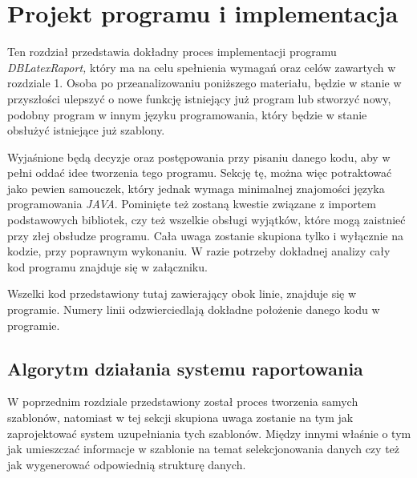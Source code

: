 \chapter{Projekt programu i implementacja}

Ten rozdział przedstawia dokładny proces implementacji programu \emph{DBLatexRaport,}  który ma na celu spełnienia wymagań oraz celów zawartych w rozdziale 1.  Osoba po przeanalizowaniu poniższego materiału, będzie w stanie w przyszłości ulepszyć o nowe funkcję istniejący już program lub stworzyć nowy, podobny program w innym języku programowania, który będzie w stanie obsłużyć istniejące już szablony. 
\par
 Wyjaśnione będą decyzje oraz postępowania przy pisaniu danego kodu, aby w pełni oddać idee tworzenia tego programu. Sekcję tę, można więc potraktować jako pewien samouczek, który jednak wymaga minimalnej znajomości języka programowania \emph{JAVA}. Pominięte też zostaną kwestie związane z importem podstawowych bibliotek, czy też wszelkie obsługi wyjątków, które mogą zaistnieć przy złej obsłudze programu. Cała uwaga zostanie skupiona tylko i wyłącznie na kodzie, przy poprawnym wykonaniu. W razie potrzeby dokładnej analizy cały kod programu znajduje się w załączniku.
 \par
 Wszelki kod przedstawiony tutaj zawierający obok linie, znajduje się w programie. Numery linii odzwierciedlają dokładne położenie danego kodu w programie.

\section{Algorytm działania systemu raportowania}

W poprzednim rozdziale przedstawiony został proces tworzenia samych szablonów, natomiast w tej sekcji skupiona uwaga zostanie na tym jak zaprojektować system uzupełniania tych szablonów. Między innymi właśnie o tym jak umieszczać informacje w szablonie na temat selekcjonowania danych czy też jak wygenerować odpowiednią strukturę danych.

